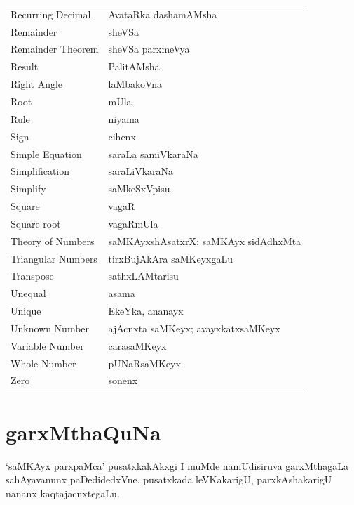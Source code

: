 \begin{longtable}{>{\rm}l@{\hspace{1.25cm}}l}
Recurring Decimal & AvataRka dashamAMsha\\
Remainder & sheVSa\\
Remainder Theorem & sheVSa parxmeVya\\
Result & PalitAMsha\\
Right Angle & laMbakoVna\\
Root & mUla\\
Rule & niyama\\
Sign & cihenx\\
Simple Equation & saraLa samiVkaraNa\\
Simplification & saraLiVkaraNa\\
Simplify & saMkeSxVpisu\\
Square & vagaR\\
Square root & vagaRmUla\\
Theory of Numbers & saMKAyxshAsatxrX; saMKAyx sidAdhxMta\\
Triangular Numbers & tirxBujAkAra saMKeyxgaLu\\
Transpose & sathxLAMtarisu\\
Unequal & asama\\
Unique & EkeYka, ananayx\\
Unknown Number & ajAcnxta saMKeyx; avayxkatxsaMKeyx\\
Variable Number & carasaMKeyx\\
Whole Number & pUNaRsaMKeyx\\
Zero & sonenx
\end{longtable}

\eject
\section*{\hspace{4.5cm}garxMthaQuNa}

`saMKAyx parxpaMca' pusatxkakAkxgi I muMde namUdisiruva garxMthagaLa sahAyavanunx paDedidedxVne. pusatxkada leVKakarigU, parxkAshakarigU nananx kaqtajacnxtegaLu.

